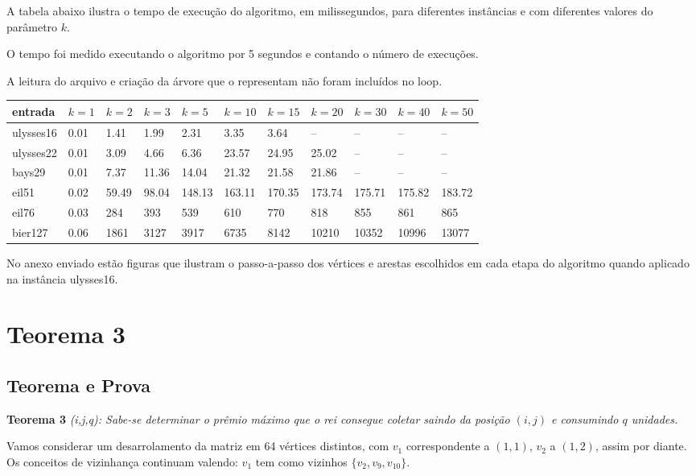 \documentclass[a4paper]{article}
\begin{document}
A tabela abaixo ilustra o tempo de execução do algoritmo, em milissegundos, para diferentes instâncias e com diferentes valores do parâmetro $k$.

O tempo foi medido executando o algoritmo por 5 segundos e contando o número de execuções.

A leitura do arquivo e criação da árvore que o representam não foram incluídos no loop.

\begin{table}[H]
\centering
\begin{tabular}{l|l|l|l|l|l|l|l|l|l|l}
entrada & $k=1$ & $k=2$ & $k=3$ & $k=5$ & $k=10$ & $k=15$ & $k=20$ & $k=30$ & $k=40$ & $k=50$ \\\hline
ulysses16 & 0.01 & 1.41 & 1.99 & 2.31 & 3.35 & 3.64 & -- & -- & -- & -- \\
ulysses22 & 0.01 & 3.09 & 4.66 & 6.36 & 23.57 & 24.95 & 25.02 & -- & -- & -- \\
bays29 & 0.01 & 7.37 & 11.36 & 14.04 & 21.32 & 21.58 & 21.86 & -- & -- & -- \\
eil51 & 0.02 & 59.49 & 98.04 & 148.13 & 163.11 & 170.35 & 173.74 & 175.71 & 175.82 & 183.72 \\
eil76 & 0.03 & 284 & 393 & 539 & 610 & 770 & 818 & 855 & 861 & 865 \\
bier127 & 0.06 & 1861 & 3127 & 3917 & 6735 & 8142 & 10210 & 10352 & 10996 & 13077

\end{tabular}
\end{table}

No anexo enviado estão figuras que ilustram o passo-a-passo dos vértices e arestas escolhidos em cada etapa do algoritmo quando aplicado na instância ulysses16.

\section*{Teorema 3}

\subsection*{Teorema e Prova}

\textbf{Teorema 3}
\textit{(i,j,q): Sabe-se determinar o prêmio máximo que o rei consegue coletar saindo da posição $(i,j)$ e consumindo $q$ unidades.}

Vamos considerar um desarrolamento da matriz em 64 vértices distintos, com $v_1$ correspondente a $(1,1)$, $v_2$ a $(1,2)$, assim por diante. Os conceitos de vizinhança continuam valendo: $v_1$ tem como vizinhos $\{v_2, v_9, v_10\}$.
\end{document}
